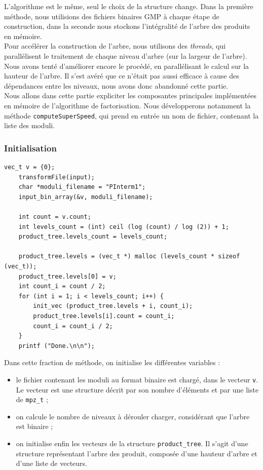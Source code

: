 L'algorithme est le même, seul le choix de la structure change.
Dans la première méthode, nous utilisions des fichiers binaires GMP à chaque étape de construction, dans la  seconde nous stockons l'intégralité de l'arbre des produits en mémoire.\\


Pour accélérer la construction de l'arbre, nous utilisons des \textit{threads}, qui parallélisent le traitement de chaque niveau d'arbre (sur la largeur de l'arbre).
Nous avons tenté d'améliorer encore le procédé, en parallélisant le calcul sur la hauteur de l'arbre. Il s'est avéré que ce n'était pas aussi efficace à cause des dépendances entre les niveaux, nous avons donc abandonné cette partie.\\


Nous allons dans cette partie expliciter les composantes principales implémentées en mémoire de l'algorithme de factorisation.  Nous développerons notamment la méthode \texttt{computeSuperSpeed}, qui prend en entrée un nom de fichier, contenant la liste des moduli. 


\subsubsection{Initialisation}

\begin{lstlisting}[style=customc,caption=fact\_superspeed.c - partie 1, label=fact1]
	vec_t v = {0};
	transformFile(input);
	char *moduli_filename = "PInterm1";
	input_bin_array(&v, moduli_filename);
	
	int count = v.count;
	int levels_count = (int) ceil (log (count) / log (2)) + 1;
	product_tree.levels_count = levels_count;
	
	product_tree.levels = (vec_t *) malloc (levels_count * sizeof (vec_t));
	product_tree.levels[0] = v;
	int count_i = count / 2;
	for (int i = 1; i < levels_count; i++) {
		init_vec (product_tree.levels + i, count_i);
		product_tree.levels[i].count = count_i;
		count_i = count_i / 2;
	}
	printf ("Done.\n\n");
\end{lstlisting}

Dans cette fraction de méthode, on initialise les différentes variables :
\begin{itemize}
	\item le fichier contenant les moduli au format binaire est chargé, dans le vecteur \texttt{v}. Le vecteur est une structure décrit par son nombre d'éléments et par une liste de \texttt{mpz\_t} ;
	\item on calcule le nombre de niveaux à dérouler charger, considérant que l'arbre est binaire ;
	\item on initialise enfin les vecteurs de la structure \texttt{product\_tree}. Il s'agit d'une structure représentant  l'arbre des produit, composée d'une hauteur d'arbre et d'une liste de vecteurs.
\end{itemize}



